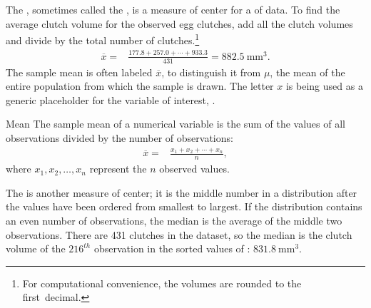 The , sometimes called the , is a measure of center for a  of data. To find the average clutch volume for the observed egg clutches, add all the clutch volumes and divide by the total number of clutches.\footnote{For computational convenience, the volumes are rounded to the first~decimal.}
\begin{align*}
\overline{x} =& \frac{177.8 + 257.0 + \cdots + 933.3}{431} = 882.5\ \textrm{mm}^{3}.
\end{align*}
The sample mean is often labeled $\overline{x}$, to distinguish it from $\mu$, the mean of the entire population from which the sample is drawn. The letter $x$ is being used as a generic placeholder for the variable of interest, .

\begin{onebox}{Mean}
		The sample mean of a numerical variable is the sum of the values of all observations divided by the number of observations:
		\begin{align}
		\overline{x} =& \frac{x_1+x_2+\cdots+x_n}{n},
		\label{samplemeanEquation}
		\end{align}
		where $x_1, x_2, \dots, x_n$ represent the $n$ observed values.
\end{onebox}

The  is another measure of center; it is the middle number in a distribution after the values have been ordered from smallest to largest. If the distribution contains an even number of observations, the median is the average of the middle two observations. There are 431 clutches in the dataset, so the median is the clutch volume of the $216^{th}$ observation in the sorted values of : $831.8\ \textrm{mm}^{3}$.


